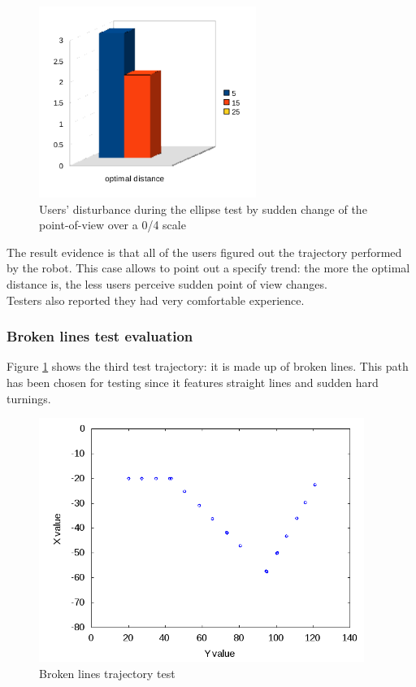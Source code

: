 \begin{figure}[!h]
  \begin{center}
    \includegraphics[width=200pt]{img/ellipse.png}
    \caption{Users' disturbance during the ellipse test 
      by sudden change of the point-of-view over a 0/4 scale}
  \end{center}
\end{figure}
%
The result evidence is that all of the users figured out the
trajectory performed by the robot. This case allows to point out
a specify trend: the more the optimal distance is, the less users
perceive sudden point of view changes.
\\
Testers also reported they had very comfortable experience.


\subsubsection{Broken lines test evaluation}
\label{performance_evaluation:tests_result:zigzagtest}

Figure \ref{fig:zigzagtest} shows the third test trajectory:
it is made up of broken lines. This path has been chosen for testing
since it features straight lines and sudden hard turnings.

\begin{figure}[!h]
  \begin{center}
    \includegraphics[width=300pt]{img/path_session_6.png}
    \caption{Broken lines trajectory test}
    \label{fig:zigzagtest}
  \end{center}
\end{figure}


